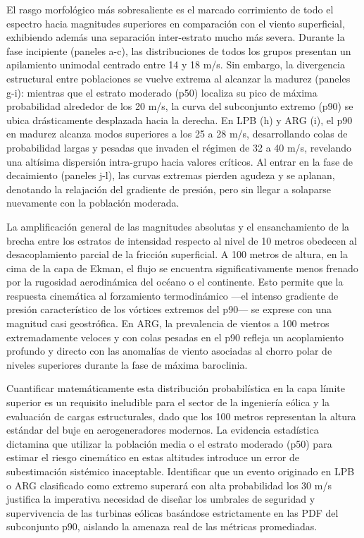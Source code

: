 El rasgo morfológico más sobresaliente es el marcado corrimiento de todo el espectro hacia magnitudes superiores en comparación con el viento superficial, exhibiendo además una separación inter-estrato mucho más severa. Durante la fase incipiente (paneles a-c), las distribuciones de todos los grupos presentan un apilamiento unimodal centrado entre 14 y 18 m/s. Sin embargo, la divergencia estructural entre poblaciones se vuelve extrema al alcanzar la madurez (paneles g-i): mientras que el estrato moderado (p50) localiza su pico de máxima probabilidad alrededor de los 20 m/s, la curva del subconjunto extremo (p90) se ubica drásticamente desplazada hacia la derecha. En LPB (h) y ARG (i), el p90 en madurez alcanza modos superiores a los 25 a 28 m/s, desarrollando colas de probabilidad largas y pesadas que invaden el régimen de 32 a 40 m/s, revelando una altísima dispersión intra-grupo hacia valores críticos. Al entrar en la fase de decaimiento (paneles j-l), las curvas extremas pierden agudeza y se aplanan, denotando la relajación del gradiente de presión, pero sin llegar a solaparse nuevamente con la población moderada.

La amplificación general de las magnitudes absolutas y el ensanchamiento de la brecha entre los estratos de intensidad respecto al nivel de 10 metros obedecen al desacoplamiento parcial de la fricción superficial. A 100 metros de altura, en la cima de la capa de Ekman, el flujo se encuentra significativamente menos frenado por la rugosidad aerodinámica del océano o el continente. Esto permite que la respuesta cinemática al forzamiento termodinámico —el intenso gradiente de presión característico de los vórtices extremos del p90— se exprese con una magnitud casi geostrófica. En ARG, la prevalencia de vientos a 100 metros extremadamente veloces y con colas pesadas en el p90 refleja un acoplamiento profundo y directo con las anomalías de viento asociadas al chorro polar de niveles superiores durante la fase de máxima baroclinia.

Cuantificar matemáticamente esta distribución probabilística en la capa límite superior es un requisito ineludible para el sector de la ingeniería eólica y la evaluación de cargas estructurales, dado que los 100 metros representan la altura estándar del buje en aerogeneradores modernos. La evidencia estadística dictamina que utilizar la población media o el estrato moderado (p50) para estimar el riesgo cinemático en estas altitudes introduce un error de subestimación sistémico inaceptable. Identificar que un evento originado en LPB o ARG clasificado como extremo superará con alta probabilidad los 30 m/s justifica la imperativa necesidad de diseñar los umbrales de seguridad y supervivencia de las turbinas eólicas basándose estrictamente en las PDF del subconjunto p90, aislando la amenaza real de las métricas promediadas.


